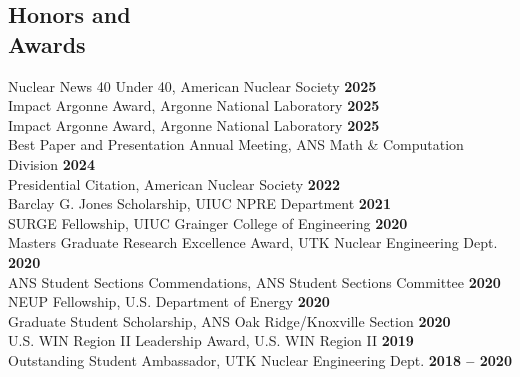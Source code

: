 \documentclass[margin,line]{resume}
\begin{document}
\begin{resume}
    \section{\mysidestyle Honors and\\Awards}
        Nuclear News 40 Under 40, American Nuclear Society \hfill \textbf{2025}\vspace{.5mm}\\
        Impact Argonne Award, Argonne National Laboratory \hfill \textbf{2025}\vspace{0.5mm}\\
        Impact Argonne Award, Argonne National Laboratory \hfill \textbf{2025}\vspace{0.5mm}\\
        Best Paper and Presentation Annual Meeting, ANS Math \& Computation Division \hfill \textbf{2024}\vspace{0.5mm}\\
        Presidential Citation, American Nuclear Society \hfill \textbf{2022}\vspace{.5mm}\\
        Barclay G. Jones Scholarship, UIUC NPRE Department \hfill \textbf{2021}\vspace{0.5mm}\\
        SURGE Fellowship, UIUC Grainger College of Engineering \hfill \textbf{2020}\vspace{0.5mm}\\
        Masters Graduate Research Excellence Award, UTK Nuclear Engineering Dept. \hfill \textbf{2020}\vspace{.5mm}\\%
        ANS Student Sections Commendations, ANS Student Sections Committee \hfill \textbf{2020}\vspace{.5mm}\\%
        NEUP Fellowship, U.S. Department of Energy \hfill \textbf{2020}\vspace{0.5mm}\\
        Graduate Student Scholarship, ANS Oak Ridge/Knoxville Section \hfill \textbf{2020}\vspace{0.5mm}\\
        U.S. WIN Region II Leadership Award, U.S. WIN Region II \hfill \textbf{2019}\vspace{.5mm}\\%
        Outstanding Student Ambassador, UTK Nuclear Engineering Dept. \hfill \textbf{2018 -- 2020}\vspace{.5mm}\\%

\end{resume}
\end{document}
